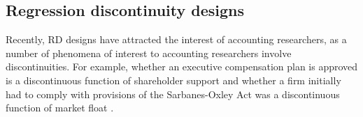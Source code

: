 \documentclass[12pt,reqno,titlepage]{amsart}
\theoremstyle{definition}
\begin{document}
\begin{doublespace}


\subsection{Regression discontinuity designs}
Recently, RD designs have attracted the interest of accounting researchers, as a number of phenomena of interest to accounting researchers involve discontinuities. 
For example, whether an executive compensation plan is approved is a discontinuous function of shareholder support \citep[e.g.,][]{Armstrong:2013io} and whether a firm initially had to comply with provisions of the Sarbanes-Oxley Act was a discontinuous function of market float \citep{Iliev:2010ic} .


\end{doublespace}
\end{document}
